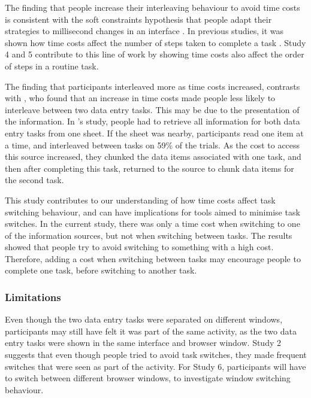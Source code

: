 
The finding that people increase their interleaving behaviour to avoid time costs is consistent with the soft constraints hypothesis that people adapt their strategies to millisecond changes in an interface \citep{Charman2003, Gray2004}. In previous studies, it was shown how time costs affect the number of steps taken to complete a task \citep{Gray2006}. Study 4 and 5 contribute to this line of work by showing time costs also affect the order of steps in a routine task.

The finding that participants interleaved more as time costs increased, contrasts with \citet{Back2012}, who found that an increase in time costs made people less likely to interleave between two data entry tasks. This may be due to the presentation of the information. In \citet{Back2012}'s study, people had to retrieve all information for both data entry tasks from one sheet. If the sheet was nearby, participants read one item at a time, and interleaved between tasks on 59\% of the trials.  As the cost to access this source increased, they chunked the data items associated with one task, and then after completing this task, returned to the source to chunk data items for the second task. 


This study contributes to our understanding of how time costs affect task switching behaviour, and can have implications for tools aimed to minimise task switches. In the current study, there was only a time cost when switching to one of the information sources, but not when switching between tasks. The results showed that people try to avoid switching to something with a high cost. Therefore, adding a cost when switching between tasks may encourage people to complete one task, before switching to another task.

\subsubsection{Limitations}
Even though the two data entry tasks were separated on different windows, participants may still have felt it was part of the same activity, as the two data entry tasks were shown in the same interface and browser window. Study 2 suggests that even though people tried to avoid task switches, they  made frequent switches that were seen as part of the activity. For Study 6, participants will have to switch between different browser windows, to investigate window switching behaviour. 

